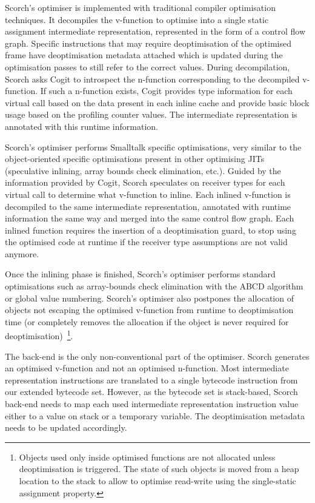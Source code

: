 \documentclass[a4paper,12pt,twoside]{../includes/ThesisStyle}
\begin{document}
Scorch's optimiser is implemented with traditional compiler optimisation techniques. It decompiles the v-function to optimise into a single static assignment intermediate representation, represented in the form of a control flow graph. Specific instructions that may require deoptimisation of the optimised frame have deoptimisation metadata attached which is updated during the optimisation passes to still refer to the correct values. During decompilation, Scorch asks Cogit to introspect the n-function corresponding to the decompiled v-function. If such a n-function exists, Cogit provides type information for each virtual call based on the data present in each inline cache and provide basic block usage based on the profiling counter values. The intermediate representation is annotated with this runtime information.


Scorch's optimiser performs Smalltalk specific optimisations, very similar to the object-oriented specific optimisations present in other optimising JITs (speculative inlining, array bounds check elimination, etc.). Guided by the information provided by Cogit, Scorch speculates on receiver types for each virtual call to determine what v-function to inline. Each inlined v-function is decompiled to the same intermediate representation, annotated with runtime information the same way and merged into the same control flow graph. Each inlined function requires the insertion of a deoptimisation guard, to stop using the optimised code at runtime if the receiver type assumptions are not valid anymore. 

Once the inlining phase is finished, Scorch's optimiser performs standard optimisations such as array-bounds check elimination with the ABCD algorithm~\cite{Bodi00a} or global value numbering. Scorch's optimiser also postpones the allocation of objects not escaping the optimised v-function from runtime to deoptimisation time (or completely removes the allocation if the object is never required for deoptimisation)~\footnote{Objects used only inside optimised functions are not allocated unless deoptimisation is triggered. The state of such objects is moved from a heap location to the stack to allow to optimise read-write using the single-static assignment property.}.

The back-end is the only non-conventional part of the optimiser. Scorch generates an optimised v-function and not an optimised n-function. Most intermediate representation instructions are translated to a single bytecode instruction from our extended bytecode set. However, as the bytecode set is stack-based, Scorch back-end needs to map each used intermediate representation instruction value either to a value on stack or a temporary variable. The deoptimisation metadata needs to be updated accordingly.
\end{document}
